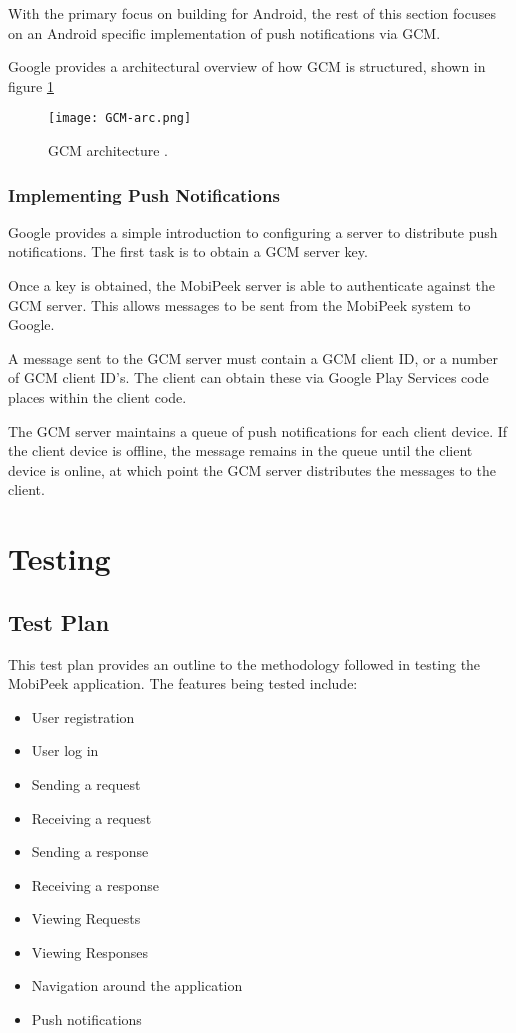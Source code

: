 \documentclass[a4paper]{article}
\begin{document}
With the primary focus on building for Android, the rest of this section focuses on an Android specific implementation of push notifications via GCM.

Google provides a architectural overview of how GCM is structured, shown in figure \ref{fig:gcmArch}

\begin{figure}[H]
  \centering
    \texttt{[image: GCM-arc.png]}
    \caption{GCM architecture .}
    \label{fig:gcmArch}
\end{figure}
\subsubsection{Implementing Push Notifications}
Google provides a simple introduction to configuring a server to distribute push notifications. The first task is to obtain a GCM server key.

Once a key is obtained, the MobiPeek server is able to authenticate against the GCM server. This allows messages to be sent from the MobiPeek system to Google.

A message sent to the GCM server must contain a GCM client ID, or a number of GCM client ID's. The client can obtain these via Google Play Services code places within the client code.

The GCM server maintains a queue of push notifications for each client device. If the client device is offline, the  message remains in the queue until the client device is online, at which point the GCM server distributes the messages to the client.
\newpage
\section{Testing}
\subsection{Test Plan}
This test plan provides an outline to the methodology followed in testing the MobiPeek application. The features being tested include:
\begin{itemize}
\item User registration
\item User log in
\item Sending a request
\item Receiving a request
\item Sending a response
\item Receiving a response
\item Viewing Requests
\item Viewing Responses
\item Navigation around the application
\item Push notifications
\end{itemize}
\end{document}
